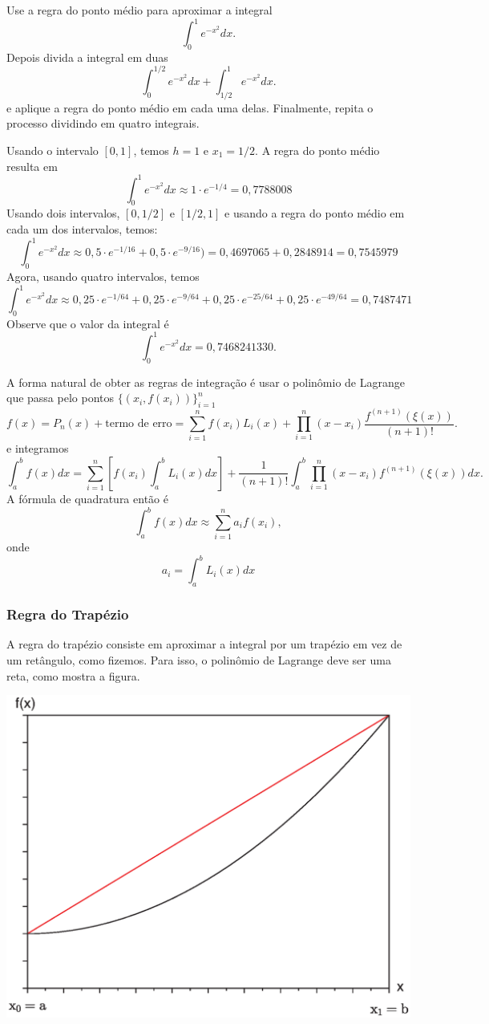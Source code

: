 \begin{ex}
Use a regra do ponto médio para aproximar a integral
$$
\int_0^1e^{-x^2}dx.
$$
Depois divida a integral em duas
$$
\int_0^{1/2}e^{-x^2}dx+\int_{1/2}^{1}e^{-x^2}dx.
$$
e aplique a regra do ponto médio em cada uma delas. Finalmente, repita o processo dividindo em quatro integrais.

Usando o intervalo $[0,1]$, temos $h=1$ e $x_1=1/2$. A regra do ponto médio resulta em
$$
\int_0^1e^{-x^2}dx\approx 1\cdot e^{-1/4}=0,7788008
$$
Usando dois intervalos, $[0,1/2]$ e $[1/2,1]$ e usando a regra do ponto médio em cada um dos intervalos, temos:
$$
\int_0^1e^{-x^2}dx\approx 0,5\cdot e^{-1/16}+0,5\cdot e^{-9/16})=0,4697065+0,2848914=0,7545979
$$
Agora, usando quatro intervalos, temos
$$
\int_0^1e^{-x^2}dx\approx 0,25\cdot e^{-1/64}+0,25\cdot e^{-9/64}+0,25\cdot e^{-25/64}+0,25\cdot e^{-49/64}=0,7487471
$$
Observe que o valor da integral é
$$
\int_0^1e^{-x^2}dx=0,7468241330.
$$
\end{ex}


A forma natural de obter as regras de integração é usar o polinômio de Lagrange que passa pelo pontos $\{(x_i,f(x_i))\}_{i=1}^n$
$$
f(x)=P_n(x)+\text{termo de erro}=\sum_{i=1}^nf(x_i)L_i(x) +\prod_{i=1}^n(x-x_i)\frac{f^{(n+1)}(\xi(x))}{(n+1)!}.
$$
e integramos
$$
\int_a^bf(x)dx=\sum_{i=1}^n\left[f(x_i)\int_a^bL_i(x)dx\right] +\frac{1}{(n+1)!}\int_a^b\prod_{i=1}^n(x-x_i)f^{(n+1)}(\xi(x))dx.
$$
A fórmula de quadratura então é
$$
\int_a^bf(x)dx\approx\sum_{i=1}^na_if(x_i),
$$
onde
$$
a_i=\int_a^bL_i(x)dx
$$

\subsubsection{Regra do Trapézio}

A regra do trapézio consiste em aproximar a integral por um trapézio em vez de um retângulo, como fizemos. Para isso, o polinômio de Lagrange deve ser uma reta, como mostra a figura.
\begin{center}
\includegraphics[scale=0.7]{./cap_derint/pics/int_2.eps}
\end{center}

